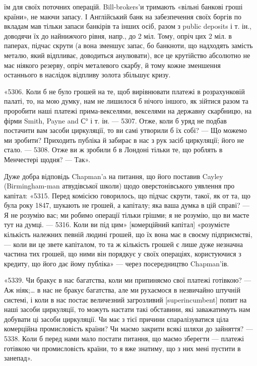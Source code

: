 \parcont{}  %
їм для своїх поточних операцій. Bill-brokers’и тримають «вільні банкові гроші
країни», не маючи запасу. І Англійський банк на забезпечення своїх боргів по
вкладам мав тільки запаси банкірів та інших осіб, разом з public deposits і т. ін.,
доводячи їх до найнижчого рівня, напр., до 2 міл. Тому, опріч цих 2 міл. в паперах,
підчас скрути (а вона зменшує запас, бо банкноти, що надходять замість
металю, який відпливає, доводиться анулювати), все це крутійство абсолютно
не має ніякого резерву, опріч металевого скарбу, й тому кожне зменшення останнього
в наслідок відпливу золота збільшує кризу.

«5306. Коли б не було грошей на те, щоб вирівнювати платежі в розрахунковій
палаті, то, на мою думку, нам не лишилося б нічого іншого, як
зійтися разом та проробити наші платежі прима-векселями, векселями на державну
скарбницю, на фірми Smith, Payne and С° і т. ін. — 5307. Отже, коли б
уряд не подбав постачити вам засоби циркуляції, то ви самі утворили б їх
собі? — Що можемо ми зробити? Приходить публіка й забирає в нас з рук
засіб циркуляції; його не стало. — 5308. Отже ви ж зробили б в Лондоні тільки
те, що роблять в Менчестері щодня? — Так».

Дуже добра відповідь Chapman’a на питання, що його поставив Cayley
(Birmingham-man атвудівської школи) щодо оверстонівського уявлення про
капітал: «5315. Перед комісією говорилось, що підчас скрути, такої, як от та,
що була року 1847, шукають не грошей, а капіталу; яка ваша думка в цій
справі? — Я не розумію вас; ми робимо операції тільки грішми; я не розумію,
що ви маєте тут на думці. — 5316. Коли ви під цим» [комерційний капітал]
«розумієте кількість належних певній людині грошей, що їх вона має в
своєму підприємстві, — коли ви це звете капіталом, то та ж кількість грошей є
лише дуже незначна частина тих грошей, що ними він порядкує у своїх операціях,
користуючися з кредиту, що його дає йому публіка» — через посередництво
Chapman’ів.

«5339. Чи бракує в нас багатства, коли ми припиняємо свої платежі готівкою?
— Аж ніяк;\dots{} в нас не бракує багатства, але ми рухаємося в незвичайно
штучній системі, і коли в нас постає величезний загрозливий [superincumbent]
попит на наші засоби циркуляції, то можуть настати такі обставини, які
заважатимуть нам добувати ці засоби циркуляції. Чи має з тієї причини спаралізуватися
ціла комерційна промисловість країни? Чи маємо закрити всякі
шляхи до зайняття? — 5338. Коли б перед нами мало постати питання, що
маємо зберегти — платежі готівкою чи промисловість країни, то я вже знатиму,
що з них мені пустити в занепад».

